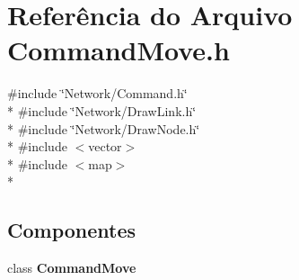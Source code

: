 \section{Referência do Arquivo Command\+Move.\+h}
\label{_command_move_8h}
{\ttfamily \#include \char`\"{}Network/\+Command.\+h\char`\"{}}\\*
{\ttfamily \#include \char`\"{}Network/\+Draw\+Link.\+h\char`\"{}}\\*
{\ttfamily \#include \char`\"{}Network/\+Draw\+Node.\+h\char`\"{}}\\*
{\ttfamily \#include $<$vector$>$}\\*
{\ttfamily \#include $<$map$>$}\\*
\subsection*{Componentes}
\begin{DoxyCompactItemize}
\item 
class {\bf Command\+Move}
\end{DoxyCompactItemize}
